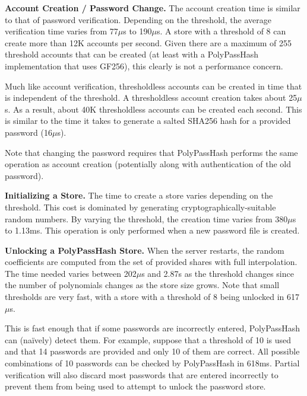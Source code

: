 {\bf Account Creation / Password Change.}
The account creation time is similar to that of password verification.
Depending on the threshold, the average verification time 
varies from 77$\mu$s to 190$\mu$s.  
A store with a threshold of 8 can create more than 12K 
accounts per second.   Given there are a maximum of 255 threshold accounts
that can be created (at least with a PolyPassHash implementation that uses
GF256), this clearly is not a performance concern.


Much like account verification, thresholdless accounts can be created in 
time that is independent of the threshold.   
A thresholdless account creation takes about 25$\mu$s.   As a result, 
about 40K thresholdless accounts can be created each second.   This is
similar to the time it takes to generate a salted SHA256 hash for a 
provided password (16$\mu$s). 

Note that changing the password requires that PolyPassHash performs the same
operation as account creation (potentially along 
with authentication of the old password).


{\bf Initializing a Store.}
The time to create a store varies depending on the threshold.   This
cost is dominated by generating cryptographically-suitable random
numbers.   By varying the threshold, the creation time varies from 
380$\mu$s to 1.13ms.   This operation is only performed when a 
new password file is created.

{\bf Unlocking a PolyPassHash Store.}
When the server restarts, the
random coefficients are computed from the set of provided shares with
full interpolation.   The time needed varies 
between 202$\mu$s and 2.87s as the threshold changes since
the number of polynomials changes as the store size grows.
Note that small thresholds are very fast, with a store with a threshold of 8
being unlocked in 617$\mu$s.

This is fast enough that if some passwords are incorrectly entered, 
PolyPassHash can (na\"ively) detect them.   For example, suppose that
a threshold of 10 is used and that 14 passwords are provided and only
10 of them are correct.   All possible combinations of 10 passwords can be
checked by PolyPassHash in 618ms.
Partial verification will also discard most passwords that are entered 
incorrectly to prevent them from being used to attempt to unlock the 
password store.


